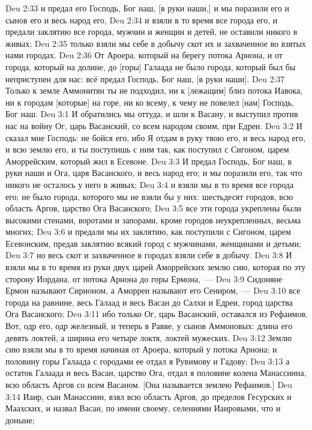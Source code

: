 \vs Deu 2:33 и предал его Господь, Бог наш, [в руки наши,] и мы поразили его и сынов его и весь народ его,
\vs Deu 2:34 и взяли в то время все города его, и предали заклятию все города, мужчин и женщин и детей, не оставили никого в живых;
\vs Deu 2:35 только взяли мы себе в добычу скот их и захваченное во взятых нами городах.
\vs Deu 2:36 От Ароера, который на берегу потока Арнона, и от города, который на долине, до [горы] Галаада не было города, который был бы неприступен для нас: всё предал Господь, Бог наш, [в руки наши].
\vs Deu 2:37 Только к земле Аммонитян ты не подходил, ни к  [лежащим] близ потока Иавока, ни к городам [которые] на горе, ни ко всему, к чему не повелел [нам] Господь, Бог наш.
\vs Deu 3:1 И обратились мы оттуда, и шли к Васану, и выступил против нас на войну Ог, царь Васанский, со всем народом своим, при Едреи.
\vs Deu 3:2 И сказал мне Господь: не бойся его, ибо Я отдам в руку твою его, и весь народ его, и всю землю его, и ты поступишь с ним так, как поступил с Сигоном, царем Аморрейским, который жил в Есевоне.
\vs Deu 3:3 И предал Господь, Бог наш, в руки наши и Ога, царя Васанского, и весь народ его; и мы поразили его, так что никого не осталось у него в живых;
\vs Deu 3:4 и взяли мы в то время все города его; не было города, которого мы не взяли бы у них: шестьдесят городов, всю область Аргов, царство Ога Васанского;
\vs Deu 3:5 все эти города укреплены были высокими стенами, воротами и запорами, кроме городов неукрепленных, весьма многих;
\vs Deu 3:6 и предали мы их заклятию, как поступили с Сигоном, царем Есевонским, предав заклятию всякий город с мужчинами, женщинами и детьми;
\vs Deu 3:7 но весь скот и захваченное в городах взяли себе в добычу.
\vs Deu 3:8 И взяли мы в то время из руки двух царей Аморрейских землю сию, которая по эту сторону Иордана, от потока Арнона до горы Ермона,~---
\vs Deu 3:9 Сидоняне Ермон называют Сирионом, а Аморреи называют его Сениром,~---
\vs Deu 3:10 все города на равнине, весь Галаад и весь Васан до Салхи и Едреи, город царства Ога Васанского;
\vs Deu 3:11 ибо только Ог, царь Васанский, оставался из Рефаимов. Вот, одр его, одр железный, и теперь в Равве, у сынов Аммоновых: длина его девять локтей, а ширина его четыре локтя, локтей мужеских.
\vs Deu 3:12 Землю сию взяли мы в то время начиная от Ароера, который у потока Арнона; и половину горы Галаада с городами ее отдал я  Рувимову и Гадову;
\vs Deu 3:13 а остаток Галаада и весь Васан, царство Ога, отдал я половине колена Манассиина, всю область Аргов со всем Васаном. [Она называется землею Рефаимов.]
\vs Deu 3:14 Иаир, сын Манассиин, взял всю область Аргов, до пределов Гесурских и Маахских, и назвал Васан, по имени своему, селениями Иаировыми, что и доныне;
